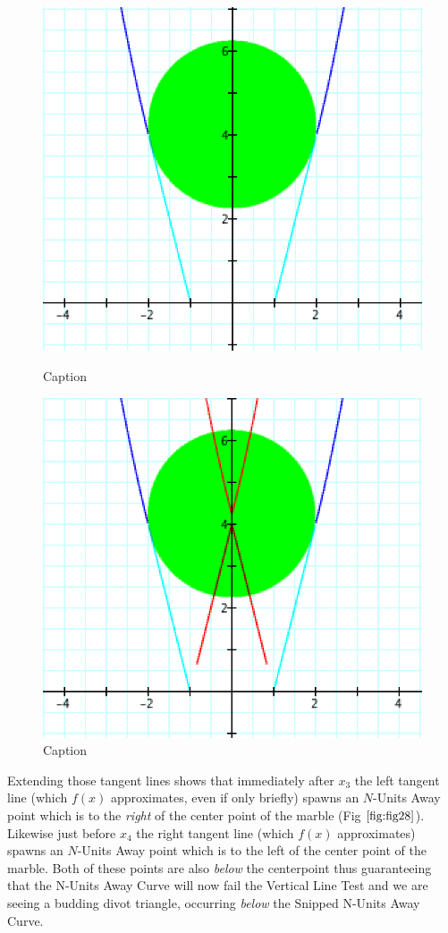 \begin{figure}[h!]
\begin{minipage}[b]{0.23\linewidth}
      \centering
      \includegraphics[width=.9\linewidth]{findig-crunch-spots-img/Fig 27.png}
      \caption{Caption}
      \label{fig:fig27}
  \end{minipage}
  \begin{minipage}[b]{0.23\linewidth}
      \centering
      \includegraphics[width=.9\linewidth]{findig-crunch-spots-img/Fig 28.png}
      \caption{Caption}
      \label{fig:fig28}
  \end{minipage}
\end{figure}

Extending those tangent lines shows that immediately after $x_3$ the left tangent line (which $f(x)$ approximates, even if only briefly) spawns an $N$-Units Away point which is to the \textit{right} of the center point of the marble (Fig $\ref{fig:fig28}$). Likewise just before $x_4$ the right tangent line (which $f(x)$ approximates) spawns an $N$-Units Away point which is to the left of the center point of the marble. Both of these points are also \textit{below} the centerpoint thus guaranteeing that the N-Units Away Curve will now fail the Vertical Line Test and we are seeing a budding divot triangle, occurring \textit{below} the Snipped N-Units Away Curve.

